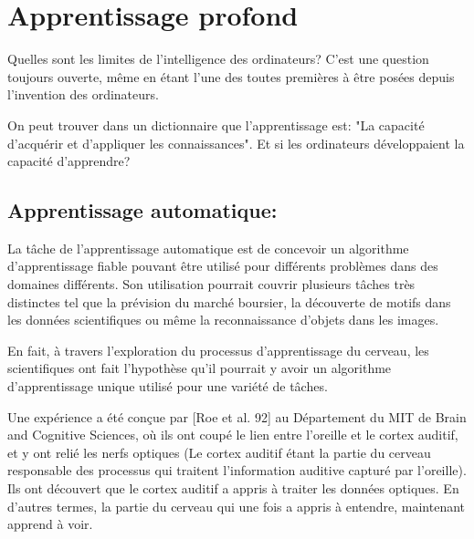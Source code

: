 
\chapter{Apprentissage profond} %



Quelles sont les limites de l'intelligence des ordinateurs? C'est une question toujours ouverte, même en étant l'une des toutes premières à être posées depuis l'invention des ordinateurs. 

On peut trouver dans un dictionnaire que l'apprentissage est: "La capacité d'acquérir et d'appliquer les connaissances". Et si les ordinateurs développaient la capacité d'apprendre?

\section{Apprentissage automatique:}



La tâche de l'apprentissage automatique est de concevoir un algorithme d'apprentissage fiable pouvant être utilisé pour différents problèmes dans des domaines différents. Son utilisation pourrait couvrir plusieurs tâches très distinctes tel que la prévision du marché boursier, la découverte de motifs dans les données scientifiques ou même la reconnaissance d'objets dans les images.

En fait, à travers l'exploration du processus d'apprentissage du cerveau, les scientifiques ont fait l'hypothèse qu'il pourrait y avoir un algorithme d'apprentissage unique utilisé pour une variété de tâches.

Une expérience a été conçue par [Roe et al. 92] au Département du MIT de Brain and Cognitive Sciences, où ils ont coupé le lien entre l'oreille et le cortex auditif, et y ont relié les nerfs optiques (Le cortex auditif étant la partie du cerveau responsable des processus qui traitent l'information auditive capturé par l'oreille). Ils ont découvert que le cortex auditif a appris à traiter les données optiques. En d'autres termes, la partie du cerveau qui une fois a appris à entendre, maintenant apprend à voir.

